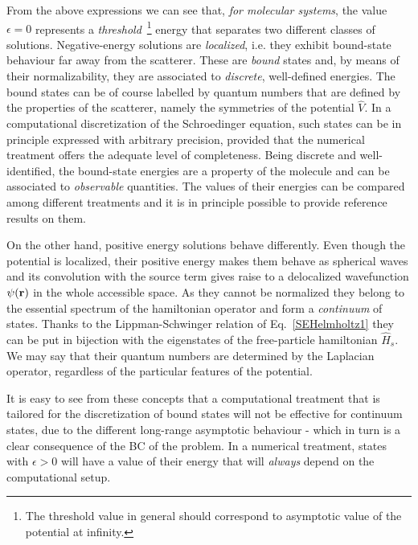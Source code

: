 \documentclass[reprint,aps,prb]{revtex4-1}
\renewcommand{\r}{{\bf r}}
\newcommand{\op}[1]{\hat {#1}}
\begin{document}
From the above expressions we can see that, \emph{for molecular systems},
the value $\epsilon=0$
represents a \emph{threshold}~\footnote{The threshold value in general should correspond to asymptotic value of the potential at infinity.} 
energy that separates two different classes of solutions.
Negative-energy solutions are \emph{localized}, i.e. they exhibit bound-state behaviour far away from the scatterer.
These are \emph{bound} states and, by means of their normalizability, they are associated to \emph{discrete}, well-defined energies.
The bound states can be of course labelled by quantum numbers that are defined by the properties of the scatterer, namely the
symmetries of the potential $\op V$.
In a computational discretization of the Schroedinger equation, such states can be in principle expressed with arbitrary precision, 
provided that the numerical treatment offers the adequate level of completeness. 
Being discrete and well-identified, the bound-state energies are a property of the molecule and can be associated to \emph{observable}
quantities. The values of their energies can be compared among different treatments and it is in principle possible to
provide reference results on them.


On the other hand, positive energy solutions behave differently. 
Even though the potential is localized, their positive energy makes them behave 
as spherical waves and its convolution with the source term  gives raise to a delocalized wavefunction $\psi(\r)$ 
in the whole accessible space.
As they cannot be normalized they belong to the essential spectrum of the hamiltonian operator and form a \emph{continuum} of states.
Thanks to the Lippman-Schwinger relation of Eq.~\eqref{SEHelmholtz1} they can be put in bijection with the eigenstates of the 
free-particle hamiltonian $\op H_s$. We may say that their quantum numbers are determined by the Laplacian operator, 
regardless of the particular features of the potential.

It is easy to see from these concepts that a computational treatment that is tailored for the discretization of bound states
will not be effective for continuum states, due to the different long-range asymptotic behaviour - which in turn is a clear consequence of the 
BC of the problem. In a numerical treatment, states with $\epsilon > 0$ will have a value of their energy that will \emph{always}
depend on the computational setup.
\end{document}
